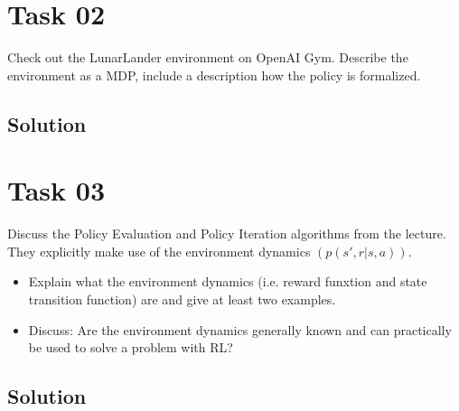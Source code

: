 \documentclass{article}
\begin{document}
\section{Task 02}
Check out the LunarLander environment on OpenAI Gym. Describe the environment as a MDP, 
include a description how the policy is
formalized.
\subsection{Solution}

\section{Task 03}
Discuss the Policy Evaluation and Policy Iteration algorithms from the lecture.
They explicitly make use of the environment dynamics $(p(s', r | s, a))$.
\begin{itemize}
    \item Explain what the environment dynamics (i.e. reward funxtion and
    state transition function) are and give at least two examples.
    \item Discuss: Are the environment dynamics generally known and can practically
    be used to solve a problem with RL?
\end{itemize}
\subsection{Solution}




\end{document}
